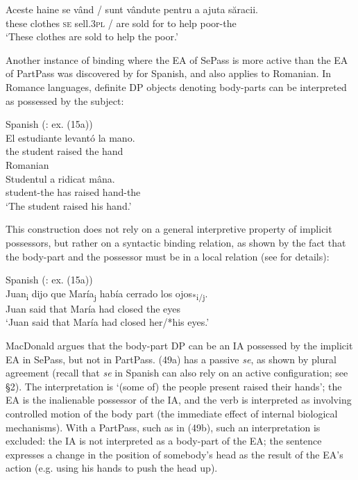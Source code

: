 \documentclass[output=paper]{langsci/langscibook}
\begin{document}
\ea%
    \label{ex:giurgea:46}
    \gll Aceste  haine   se vând     / sunt vândute pentru a ajuta săracii.\\
         these    clothes \textsc{se} sell.\textsc{3pl}  / are sold       for      to help poor-the\\
    \glt ‘These clothes are sold to help the poor.’
    \z

Another instance of binding where the EA of SePass is more active than the EA of PartPass was discovered by \citet{MacDonald2017} for Spanish, and also applies to Romanian. In Romance languages, definite DP objects denoting body-parts can be interpreted as possessed by the subject:

\ea%
    \label{ex:giurgea:47}
    \ea Spanish (\citealt{MacDonald2017}: ex. (15a))\\
    \gll El  estudiante levantó la mano.   \\
         the student     raised   the hand \\
    \ex Romanian\\
    \gll Studentul   a    ridicat mâna.  \\
         student-the has raised hand-the\\
    \glt ‘The student raised his hand.’
    \z
\z    

This construction does not rely on a general interpretive property of implicit possessors, but rather on a syntactic binding relation, as shown by the fact that the body-part and the possessor must be in a local relation (see \citealt{MacDonald2017} for details):

\ea%
    Spanish (\citealt{MacDonald2017}: ex. (15a))\label{ex:giurgea:48}\\
    \gll Juan\textsubscript{i} dijo que María\textsubscript{j} había cerrado los ojos\textsubscript{*i/j}.   \\
         Juan said that María  had    closed   the eyes      \\
    \glt ‘Juan said that María had closed her/*his eyes.’ 
    \z

MacDonald argues that the body-part DP can be an IA possessed by the implicit EA in SePass, but not in PartPass. (49a) has a passive \textit{se}, as shown by plural agreement (recall that \textit{se} in Spanish can also rely on an active configuration; see §2). The interpretation is ‘(some of) the people present raised their hands’; the EA is the inalienable possessor of the IA, and the verb is interpreted as involving controlled motion of the body part (the immediate effect of internal biological mechanisms). With a PartPass, such as in (49b), such an interpretation is excluded: the IA is not interpreted as a body-part of the EA; the sentence expresses a change in the position of somebody’s head as the result of the EA’s action (e.g. using his hands to push the head up).   
\end{document}
